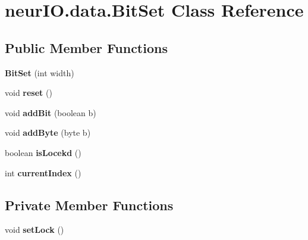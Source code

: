 \hypertarget{classneur_i_o_1_1data_1_1_bit_set}{}\section{neur\+I\+O.\+data.\+Bit\+Set Class Reference}
\label{classneur_i_o_1_1data_1_1_bit_set}
\subsection*{Public Member Functions}
\begin{DoxyCompactItemize}
\item 
\mbox{\label{classneur_i_o_1_1data_1_1_bit_set_a425a3d991ae3bae79a20216914f0475b}} 
{\bfseries Bit\+Set} (int width)
\item 
\mbox{\label{classneur_i_o_1_1data_1_1_bit_set_af6f1dfe4ce5582a89dd327305d6d8f87}} 
void {\bfseries reset} ()
\item 
\mbox{\label{classneur_i_o_1_1data_1_1_bit_set_a168de8cb6d3f39583c480859cefcc4e0}} 
void {\bfseries add\+Bit} (boolean b)
\item 
\mbox{\label{classneur_i_o_1_1data_1_1_bit_set_a2d7d9ae61ce5ec45d924b150213ada2e}} 
void {\bfseries add\+Byte} (byte b)
\item 
\mbox{\label{classneur_i_o_1_1data_1_1_bit_set_a4d57df84bc520d32429e6ae8ee4b2d9f}} 
boolean {\bfseries is\+Locekd} ()
\item 
\mbox{\label{classneur_i_o_1_1data_1_1_bit_set_a92a69cf498204d16c617a76c6110a3fe}} 
int {\bfseries current\+Index} ()
\end{DoxyCompactItemize}
\subsection*{Private Member Functions}
\begin{DoxyCompactItemize}
\item 
\mbox{\label{classneur_i_o_1_1data_1_1_bit_set_a53af6540a17581388d62d6f432f5d80d}} 
void {\bfseries set\+Lock} ()
\end{DoxyCompactItemize}
